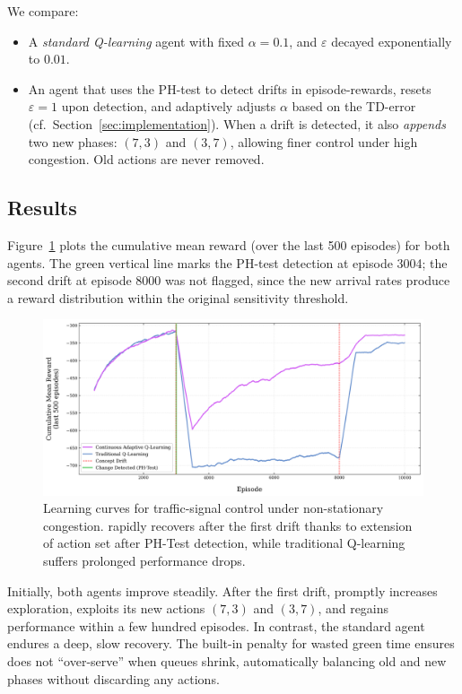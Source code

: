 We compare:
\begin{itemize}
  \item A \emph{standard Q-learning} agent with fixed $\alpha=0.1$, and $\varepsilon$ decayed exponentially to $0.01$.
  \item An \emph{\adaptiverl} agent that uses the PH-test to detect drifts in episode-rewards, resets $\varepsilon\!=\!1$ upon detection, and adaptively adjusts $\alpha$ based on the TD-error (cf.\ Section~\ref{sec:implementation}).  When a drift is detected, it also \emph{appends} two new phases:
    $(7,3)$ and $(3,7)$, allowing finer control under high congestion. Old actions are never removed.
\end{itemize}

\subsection{Results}
Figure~\ref{fig:traffic-learning-curve} plots the cumulative mean reward (over the last 500 episodes) for both agents. The green vertical line marks the PH-test detection at episode 3004; the second drift at episode 8000 was not flagged, since the new arrival rates produce a reward distribution within the original sensitivity threshold.

\begin{figure}
    \centering
    \includegraphics[width=\textwidth]{figures/traffic_learning_curve.png}
    \caption{Learning curves for traffic-signal control under non-stationary congestion. \adaptiverl rapidly recovers after the first drift thanks to extension of action set after PH-Test detection, while traditional Q-learning suffers prolonged performance drops.}
    \label{fig:traffic-learning-curve}
\end{figure}

Initially, both agents improve steadily. After the first drift, \adaptiverl promptly increases exploration, exploits its new actions $(7,3)$ and $(3,7)$, and regains performance within a few hundred episodes. In contrast, the standard agent endures a deep, slow recovery. The built-in penalty for wasted green time ensures \adaptiverl does not “over-serve” when queues shrink, automatically balancing old and new phases without discarding any actions.

